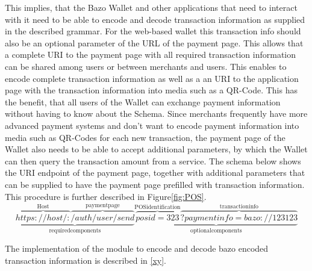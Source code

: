 \documentclass[a4paper]{article}
\begin{document}
This implies, that the Bazo Wallet and other applications that need to interact with it need to be able to encode and decode transaction information as supplied in the described grammar.
For the web-based wallet this transaction info should also be an optional parameter of the URL of the payment page. This allows that a complete URI to the payment page with all required transaction information can be shared among users or between merchants and users.
This enables to encode complete transaction information as well as a an URI to the application page with the transaction information into media such as a QR-Code. This has the benefit, that all users of the Wallet can exchange payment information without having to know about the Schema.
Since merchants frequently have more advanced payment systems and don't want to encode payment information into media such as QR-Codes for each new transaction, the payment page of the Wallet also needs to be able to accept additional parameters, by which the Wallet can then query the transaction amount from a service.
The schema below shows the URI endpoint of the payment page, together with additional parameters that can be supplied to have the payment page prefilled with transaction information. This procedure is further described in Figure\ref{fig:POS}.
\[
\underbrace{\overbrace{https://host/:}^{\mathrm{Host}}\overbrace{/auth/user/send}^{\mathrm{payment page}}}_{\mathrm{required components}}
\underbrace{\overbrace{posid=323}^{\mathrm{POS identification}}\overbrace{?paymentinfo=bazo://123123}^{\mathrm{transaction info}}}_{\mathrm{optional components}}
\]

The implementation of the module to encode and decode bazo encoded transaction information is described in \ref{xy}.
\end{document}
